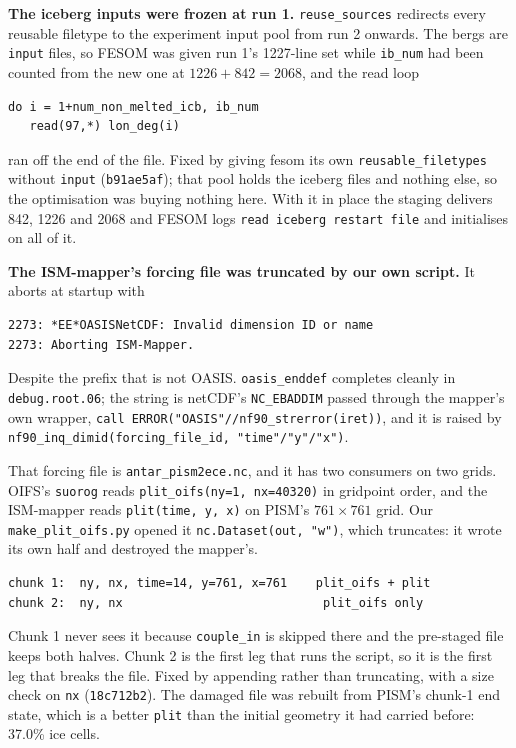 \documentclass[11pt,a4paper]{article}
\newcommand{\code}[1]{\texttt{\small #1}}
\begin{document}
\medskip\noindent
\textbf{The iceberg inputs were frozen at run 1.} \code{reuse\_sources} redirects every reusable
filetype to the experiment input pool from run 2 onwards. The bergs are \code{input} files, so
FESOM was given run 1's 1227-line set while \code{ib\_num} had been counted from the new one at
$1226 + 842 = 2068$, and the read loop

\begin{verbatim}
do i = 1+num_non_melted_icb, ib_num
   read(97,*) lon_deg(i)
\end{verbatim}

\noindent
ran off the end of the file. Fixed by giving fesom its own \code{reusable\_filetypes} without
\code{input} (\code{b91ae5af}); that pool holds the iceberg files and nothing else, so the
optimisation was buying nothing here. With it in place the staging delivers 842, 1226 and 2068 and
FESOM logs \code{read iceberg restart file} and initialises on all of it.

\medskip\noindent
\textbf{The ISM-mapper's forcing file was truncated by our own script.} It aborts at startup with

\begin{verbatim}
2273: *EE*OASISNetCDF: Invalid dimension ID or name
2273: Aborting ISM-Mapper.
\end{verbatim}

\noindent
Despite the prefix that is not OASIS. \code{oasis\_enddef} completes cleanly in
\code{debug.root.06}; the string is netCDF's \code{NC\_EBADDIM} passed through the mapper's own
wrapper, \code{call ERROR("OASIS"//nf90\_strerror(iret))}, and it is raised by
\code{nf90\_inq\_dimid(forcing\_file\_id, "time"/"y"/"x")}.

That forcing file is \code{antar\_pism2ece.nc}, and it has two consumers on two grids. OIFS's
\code{suorog} reads \code{plit\_oifs(ny{=}1, nx{=}40320)} in gridpoint order, and the ISM-mapper
reads \code{plit(time, y, x)} on PISM's $761 \times 761$ grid. Our \code{make\_plit\_oifs.py}
opened it \code{nc.Dataset(out, "w")}, which truncates: it wrote its own half and destroyed the
mapper's.

\begin{verbatim}
chunk 1:  ny, nx, time=14, y=761, x=761    plit_oifs + plit
chunk 2:  ny, nx                            plit_oifs only
\end{verbatim}

\noindent
Chunk 1 never sees it because \code{couple\_in} is skipped there and the pre-staged file keeps both
halves. Chunk 2 is the first leg that runs the script, so it is the first leg that breaks the file.
Fixed by appending rather than truncating, with a size check on \code{nx}
(\code{18c712b2}). The damaged file was rebuilt from PISM's chunk-1 end state, which is a better
\code{plit} than the initial geometry it had carried before: 37.0\% ice cells.
\end{document}
